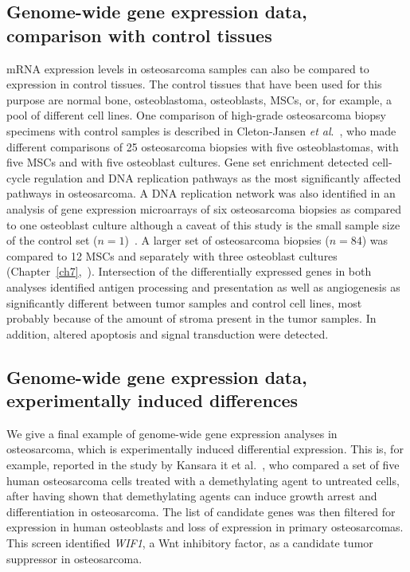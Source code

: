 \subsection{Genome\hyp{}wide gene expression data, comparison with control tissues}
mRNA expression levels in osteosarcoma samples can also be
compared to expression in control tissues. The control tissues
that have been used for this purpose are normal bone, osteoblastoma,
osteoblasts, MSCs, or, for example, a pool of different
cell lines. One comparison of high\hyp{}grade osteosarcoma
biopsy specimens with control samples is described in Cleton-Jansen {\it et al}.~\cite{cleton2009profiling}, who made different comparisons of 25 osteosarcoma
biopsies with five osteoblastomas, with five MSCs
and with five osteoblast cultures. Gene set enrichment
detected cell\hyp{}cycle regulation and DNA replication pathways
as the most significantly affected pathways in osteosarcoma.
A DNA replication network was also identified in an analysis
of gene expression microarrays of six osteosarcoma biopsies
as compared to one osteoblast culture although a caveat of
this study is the small sample size of the control set
($n=1$)~\cite{sadikovic2009identification}. A larger set of osteosarcoma biopsies ($n=84$) was
compared to 12 MSCs and separately with three osteoblast
cultures (Chapter~\ref{ch7},~\cite{kuijjer2012identification}). Intersection of the differentially expressed genes in
both analyses identified antigen processing and presentation
as well as angiogenesis as significantly different between tumor
samples and control cell lines, most probably because of
the amount of stroma present in the tumor samples. In addition,
altered apoptosis and signal transduction were detected.

\subsection{Genome\hyp{}wide gene expression data, experimentally induced differences}
We give a final example of genome\hyp{}wide gene expression
analyses in osteosarcoma, which is experimentally induced
differential expression. This is, for example, reported in the
study by Kansara {it et al}.~\cite{kansara2009wnt}, who compared a set of five human
osteosarcoma cells treated with a demethylating agent to
untreated cells, after having shown that demethylating agents
can induce growth arrest and differentiation in osteosarcoma.
The list of candidate genes was then filtered for expression in
human osteoblasts and loss of expression in primary osteosarcomas.
This screen identified {\it WIF1}, a Wnt inhibitory factor,
as a candidate tumor suppressor in osteosarcoma.

